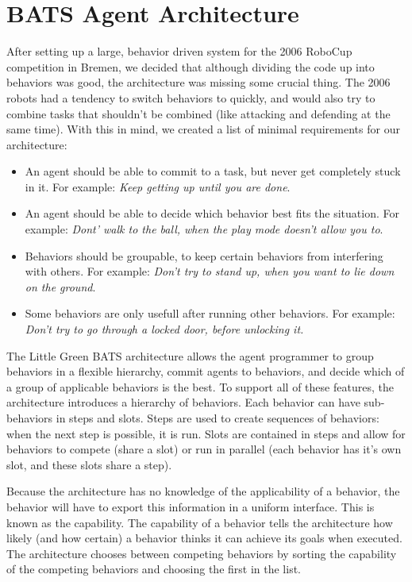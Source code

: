 \chapter{BATS Agent Architecture}
\label{chArchitecture}


After setting up a large, behavior driven system for the 2006 RoboCup competition in Bremen, we decided that although dividing the code up into behaviors was good, the architecture was missing some crucial thing. The 2006 robots had a tendency to switch behaviors to quickly, and would also try to combine tasks that shouldn't be combined (like attacking and defending at the same time).
With this in mind, we created a list of minimal requirements for our architecture:
\begin{itemize}
\item An agent should be able to commit to a task, but never get completely stuck in it. For example: \emph{Keep getting up until you are done}.
\item An agent should be able to decide which behavior best fits the situation. For example: \emph{Dont' walk to the ball, when the play mode doesn't allow you to}.
\item Behaviors should be groupable, to keep certain behaviors from interfering with others. For example: \emph{Don't try to stand up, when you want to lie down on the ground}.
\item Some behaviors are only usefull after running other behaviors. For example: \emph{Don't try to go through a locked door, before unlocking it.}
\end{itemize}

The Little Green BATS architecture allows the agent programmer to group behaviors in a flexible hierarchy, commit agents to behaviors, and decide which of a group of applicable behaviors is the best.
To support all of these features, the architecture introduces a hierarchy of behaviors. Each behavior can have sub-behaviors in steps and slots.
Steps are used to create sequences of behaviors: when the next step is possible, it is run.
Slots are contained in steps and allow for behaviors to compete (share a slot) or run in parallel (each behavior has it's own slot, and these slots share a step).

Because the architecture has no knowledge of the applicability of a behavior, the behavior will have to export this information in a uniform interface. This is known as the capability. The capability of a behavior tells the architecture how likely (and how certain) a behavior thinks it can achieve its goals when executed. The architecture chooses between competing behaviors by sorting the capability of the competing behaviors and choosing the first in the list. 



